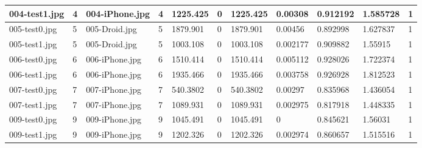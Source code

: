 \begin{landscape}
\begin{longtable}{|p{2cm}|p{1cm}|p{2cm}|p{1cm}|p{2cm}|p{1cm}|p{2cm}|p{2cm}|p{2cm}|p{2cm}|p{1cm}|}
		004-test1.jpg   & 4                & 004-iPhone.jpg        & 4                           & 1225.425              & 0                       & 1225.425                   & 0.00308               & 0.912192              & 1.585728                 & 1                \\ \hline
		005-test0.jpg   & 5                & 005-Droid.jpg         & 5                           & 1879.901              & 0                       & 1879.901                   & 0.00456               & 0.892998              & 1.627837                 & 1                \\ \hline
		005-test1.jpg   & 5                & 005-Droid.jpg         & 5                           & 1003.108              & 0                       & 1003.108                   & 0.002177              & 0.909882              & 1.55915                  & 1                \\ \hline
		006-test0.jpg   & 6                & 006-iPhone.jpg        & 6                           & 1510.414              & 0                       & 1510.414                   & 0.005112              & 0.928026              & 1.722374                 & 1                \\ \hline
		006-test1.jpg   & 6                & 006-iPhone.jpg        & 6                           & 1935.466              & 0                       & 1935.466                   & 0.003758              & 0.926928              & 1.812523                 & 1                \\ \hline
		007-test0.jpg   & 7                & 007-iPhone.jpg        & 7                           & 540.3802              & 0                       & 540.3802                   & 0.00297               & 0.835968              & 1.436054                 & 1                \\ \hline
		007-test1.jpg   & 7                & 007-iPhone.jpg        & 7                           & 1089.931              & 0                       & 1089.931                   & 0.002975              & 0.817918              & 1.448335                 & 1                \\ \hline
		009-test0.jpg   & 9                & 009-iPhone.jpg        & 9                           & 1045.491              & 0                       & 1045.491                   & 0                     & 0.845621              & 1.56031                  & 1                \\ \hline
		009-test1.jpg   & 9                & 009-iPhone.jpg        & 9                           & 1202.326              & 0                       & 1202.326                   & 0.002974              & 0.860657              & 1.515516                 & 1                \\ \hline

\end{longtable}
\end{landscape}
